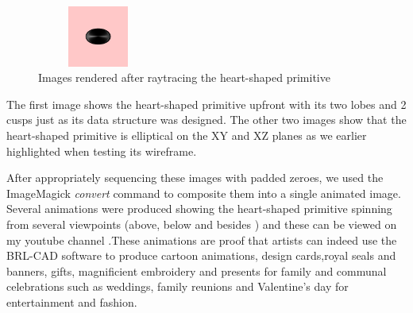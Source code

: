 \begin{figure}[htbp]
\begin{minipage}{0.2\textheight}
\begin{flushleft}
\end{flushleft}
\end{minipage}
\begin{minipage}{0.2\textheight}
\begin{flushleft}
\includegraphics[width=4cm,height=2cm, clip=true, totalheight=0.17\textheight]{Pictures/Below.png}
\end{flushleft}
\end{minipage}
\caption[Images rendered after ray­tracing the heart­-shaped primitive]{Images rendered after ray­tracing the heart-­shaped primitive}
\label{Besides}
\end{figure}

The   first   image   shows   the   heart-­shaped   primitive   upfront   with   its   two   lobes   and  
2   cusps   just   as   its   data   structure   was   designed.   The   other   two   images   show  
that   the   heart­-shaped   primitive   is   elliptical   on   the   XY   and   XZ   planes   as   we  
earlier highlighted when testing its wireframe.

\hspace{30} After   appropriately   sequencing   these   images   with   padded   zeroes,   we  
used   the   ImageMagick   \textit{convert}   command   to   composite   them   into   a   single  
animated   image.   Several   animations   were   produced   showing   the   heart­-shaped  
primitive   spinning   from   several   viewpoints   (above, below and besides )   and  
these   can   be   viewed   on   my   youtube   channel \cite{43} \cite{44} .These   animations   are   proof   that  
artists   can   indeed   use   the   BRL-­CAD   software   to   produce   cartoon   animations,  
design   cards,royal   seals   and   banners,   gifts,   magnificient   embroidery   and  
presents   for   family   and   communal   celebrations   such   as   weddings,   family  
reunions and Valentine's day for entertainment and fashion.
\clearpage
